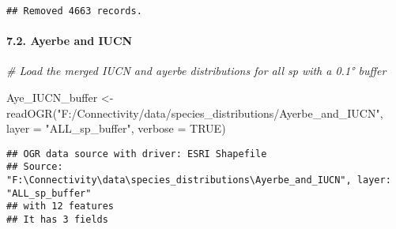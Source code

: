 \documentclass[
]{article}
\newenvironment{Shaded}{\begin{snugshade}}{\end{snugshade}}
\newcommand{\AttributeTok}[1]{\textcolor[rgb]{0.77,0.63,0.00}{#1}}
\newcommand{\CommentTok}[1]{\textcolor[rgb]{0.56,0.35,0.01}{\textit{#1}}}
\newcommand{\ConstantTok}[1]{\textcolor[rgb]{0.00,0.00,0.00}{#1}}
\newcommand{\FunctionTok}[1]{\textcolor[rgb]{0.00,0.00,0.00}{#1}}
\newcommand{\NormalTok}[1]{#1}
\newcommand{\OtherTok}[1]{\textcolor[rgb]{0.56,0.35,0.01}{#1}}
\newcommand{\StringTok}[1]{\textcolor[rgb]{0.31,0.60,0.02}{#1}}
\begin{document}
\begin{verbatim}
## Removed 4663 records.
\end{verbatim}

\hypertarget{ayerbe-and-iucn}{%
\paragraph{7.2. Ayerbe and IUCN}\label{ayerbe-and-iucn}}

\begin{Shaded}
\begin{Highlighting}[]
\CommentTok{\# Load the merged IUCN and ayerbe distributions for all sp with a 0.1° buffer}

\NormalTok{Aye\_IUCN\_buffer }\OtherTok{\textless{}{-}} \FunctionTok{readOGR}\NormalTok{(}\StringTok{"F:/Connectivity/data/species\_distributions/Ayerbe\_and\_IUCN"}\NormalTok{, }\AttributeTok{layer =} \StringTok{"ALL\_sp\_buffer"}\NormalTok{, }\AttributeTok{verbose =} \ConstantTok{TRUE}\NormalTok{)}
\end{Highlighting}
\end{Shaded}

\begin{verbatim}
## OGR data source with driver: ESRI Shapefile 
## Source: "F:\Connectivity\data\species_distributions\Ayerbe_and_IUCN", layer: "ALL_sp_buffer"
## with 12 features
## It has 3 fields
\end{verbatim}
\end{document}
